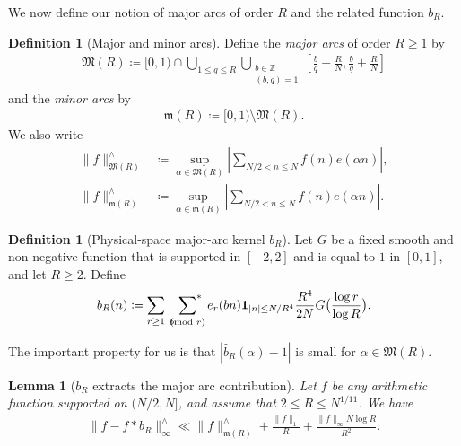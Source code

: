 \documentclass[12pt]{amsart}
\newtheorem{lemma}[theorem]{Lemma}
\theoremstyle{definition}
\newtheorem{definition}[theorem]{Definition}
\theoremstyle{remark}
\numberwithin{equation}{section}
\newcommand{\asum}{\sideset{}{^{\ast}}\sum}
\newcommand{\1}{\mathbf{1}}
\let\oldpmod\pmod
\renewcommand{\pmod}[1]{\hspace{-0.12cm}\oldpmod {#1}}
\begin{document}
We now define our notion of major arcs of order $R$ and the related function $b_R$. 
	
\begin{definition}[Major and minor arcs]\label{def_major}
    Define the \emph{major arcs} of order $R\geq 1$ by
	\begin{align*}
	   \mathfrak{M}(R)\coloneqq [0,1)\cap \bigcup_{1\leq q\leq R}\bigcup_{\substack{b\in  \mathbb{Z}\\(b,q)=1}}\left[\frac{b}{q}-\frac{R}{N},\frac{b}{q}+\frac{R}{N}\right] 
	\end{align*}
	and the \emph{minor arcs} by
	\begin{align*}
	   \mathfrak{m}(R)\coloneqq [0,1)\setminus \mathfrak{M}(R).
	\end{align*}
    We also write 
    \begin{align*}
         \|f\|_{\mathfrak{M}(R)}^{\wedge}&\coloneqq\sup_{\alpha \in \mathfrak{M}(R)}\left|\sum_{N/2<n\leq N}f(n)e(\alpha n)\right|,\\
         \|f\|_{\mathfrak{m}(R)}^{\wedge}&\coloneqq\sup_{\alpha \in \mathfrak{m}(R)}\left|\sum_{N/2<n\leq N}f(n)e(\alpha n)\right|.
    \end{align*}
\end{definition}

\begin{definition}[Physical-space major-arc kernel $b_R$]\label{def:bdef}
	Let $G$ be a fixed smooth and non-negative function that is supported in $[-2,2]$ and is equal to $1$ in $[0,1]$, and let $R\geq 2$. Define
	\begin{align*}
	b_R(n)\coloneqq\sum_{r\geq 1}\,\,\,\asum_{b\pmod r}e_r(bn)\1_{|n|\leq N/R^4}\frac{R^4}{2N}G\bigl(\frac{\log r}{\log R}\bigr).
\end{align*}
\end{definition}


The important property for us is that $|\widehat{b}_R(\alpha)-1|$ is small for $\alpha \in \mathfrak{M}(R)$.

\begin{lemma}[$b_R$ extracts the major arc contribution]\label{lem:bRextract}
	Let $f$ be any arithmetic function supported on $(N/2,N]$, and assume that $2\leq R\leq N^{1/11}$. We have
	\begin{align*}
	   \|f-f*b_R\|_{\infty}^{\wedge} \ll \|f\|_{\mathfrak{m}(R)}^{\wedge}+\frac{\|f\|_1}{R}+ \frac{\|f\|_\infty N \log R}{R^2}.
	\end{align*}
\end{lemma}
	
\end{document}
